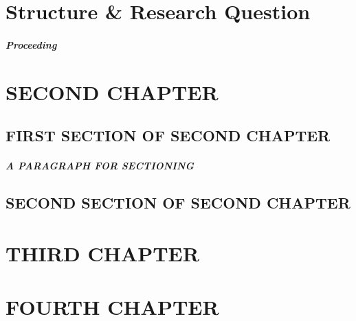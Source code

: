 \documentclass[11pt,a4paper,english]{scrreprt}
\begin{document}

\chapter{Structure \& Research Question}
	




	\paragraph{Proceeding}


	


\chapter{SECOND CHAPTER}	
	

  \section{FIRST SECTION OF SECOND CHAPTER}
 
    \paragraph{A PARAGRAPH FOR SECTIONING}

  \section{SECOND SECTION OF SECOND CHAPTER}







\chapter{THIRD CHAPTER}



 

 
\chapter{FOURTH CHAPTER}
\end{document}
